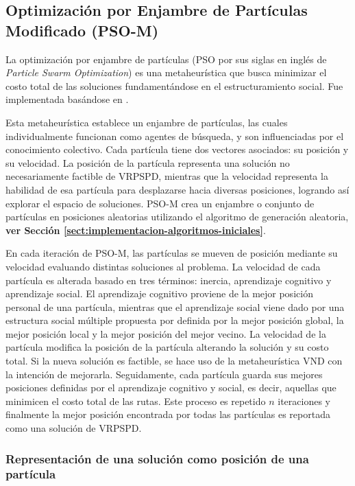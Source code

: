 	
\subsection{Optimización por Enjambre de Partículas Modificado (PSO-M)} \label{sect:implementacion-pso}

La optimización por enjambre de partículas (PSO por sus siglas en inglés de \emph{Particle Swarm Optimization}) es una metaheurística que busca minimizar el costo total de las soluciones fundamentándose en el estructuramiento social. Fue implementada basándose en \cite{mpso}.

Esta metaheurística establece un enjambre de partículas, las cuales individualmente funcionan como agentes de búsqueda, y son influenciadas por  el conocimiento colectivo. Cada partícula tiene dos vectores asociados: su posición y su velocidad. La posición de la partícula representa una solución no necesariamente factible de VRPSPD, mientras que la velocidad representa la habilidad de esa partícula para desplazarse hacia diversas posiciones, logrando así explorar el espacio de soluciones. PSO-M crea un enjambre o conjunto de partículas en posiciones aleatorias utilizando el algoritmo de generación aleatoria, \textbf{ver Sección \ref{sect:implementacion-algoritmos-iniciales}}. 

En cada iteración de PSO-M, las partículas se mueven de posición mediante su velocidad evaluando distintas soluciones al problema. La velocidad de cada partícula es alterada basado en tres términos: inercia, aprendizaje cognitivo y aprendizaje social. El aprendizaje cognitivo proviene de la mejor posición personal de una partícula, mientras que el aprendizaje social viene dado por una estructura social múltiple propuesta por \cite{mpso-social}  definida por la mejor posición global, la mejor posición local \cite{mpso-local} y la mejor posición del mejor vecino. La velocidad de la partícula modifica la posición de la partícula alterando la solución y su costo total. Si la nueva solución es factible, se hace uso de la metaheurística VND con la intención de mejorarla. Seguidamente, cada partícula guarda sus mejores posiciones definidas por el aprendizaje cognitivo y social, es decir, aquellas que minimicen el costo total de las rutas. Este proceso es repetido $n$ iteraciones y finalmente la mejor posición encontrada por todas las partículas es reportada como una solución de VRPSPD.

\subsubsection*{Representación de una solución como posición de una partícula}

